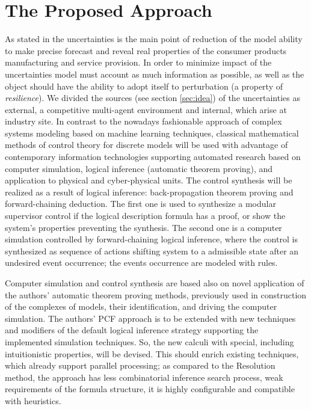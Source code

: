 \documentclass[conference]{IEEEtran}
\begin{document}
\section{The Proposed Approach}
\label{sec:methods}


As stated in \cite{b6} the uncertainties is the main point of reduction of the model ability to make precise forecast and reveal real properties of the consumer products manufacturing and service provision. In order to minimize impact of the uncertainties model must account as much information as possible, as well as the object should have the ability to adopt itself to perturbation (a property of \emph{resilience}).  We divided the sources (see section \ref{sec:idea}) of the uncertainties as external, a competitive multi-agent environment and internal, which arise at industry site.  In contrast to the nowadays fashionable approach of complex systems modeling based on machine learning techniques, classical mathematical methods of control theory for discrete models will be used with advantage of contemporary information technologies supporting automated research based on computer simulation, logical inference (automatic theorem proving), and application to physical and cyber-physical units.  The control synthesis will be realized as a result of logical inference: back-propagation theorem proving and forward-chaining deduction.  The first one is used to synthesize a modular supervisor control if the logical description formula has a proof, or show the system's properties preventing the synthesis.  The second one is a computer simulation controlled by forward-chaining logical inference, where the control is synthesized as sequence of actions shifting system to a admissible state after an undesired event occurrence; the events occurrence are modeled with rules.

Computer simulation and control synthesis are based also on novel application of the authors’ automatic theorem proving methods, previously used in construction of the complexes of models, their identification, and driving the computer simulation. The authors’ PCF approach is to be extended with new techniques and modifiers of the default logical inference strategy supporting the implemented simulation techniques. So, the new calculi with special, including intuitionistic properties, will be devised. This should enrich existing techniques, which already support parallel processing; as compared to the Resolution method, the approach has less combinatorial inference search process, weak requirements of the formula structure, it is highly configurable and compatible with heuristics.
\end{document}
